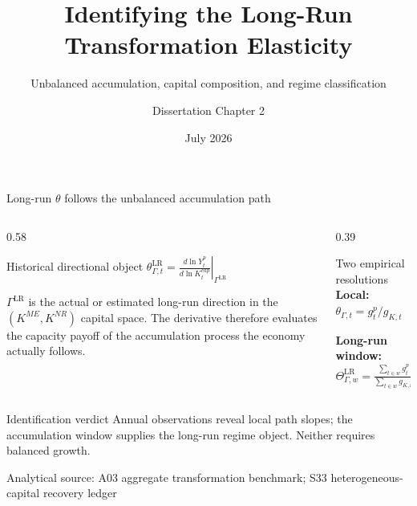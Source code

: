 \documentclass[10pt,aspectratio=169]{beamer}
\title[Directional long-run $\theta_t$]{Identifying the Long-Run Transformation Elasticity}
\subtitle{Unbalanced accumulation, capital composition, and regime classification}
\author{Dissertation Chapter 2}
\date{July 2026}
\newcommand{\LR}{\mathrm{LR}}
\newcommand{\sourcefooter}[1]{%
  \par\vfill{\tiny\color{gray!70}Analytical source: #1}\vspace{-0.35em}}
\begin{document}
\begin{frame}{Long-run $\theta$ follows the unbalanced accumulation path}
  \begin{columns}[T,onlytextwidth]
    \begin{column}{0.58\textwidth}
      \begin{block}{Historical directional object}
        \centering
        \Large
        $\displaystyle
        \theta_{\Gamma,t}^{\LR}
        =
        \left.
        \frac{d\ln Y_t^p}{d\ln K_t^{cap}}
        \right|_{\Gamma^{\LR}}$
      \end{block}
      \small
      $\Gamma^{\LR}$ is the actual or estimated long-run direction in the
      $(K^{ME},K^{NR})$ capital space. The derivative therefore evaluates the
      capacity payoff of the accumulation process the economy actually follows.
    \end{column}
    \begin{column}{0.39\textwidth}
      \begin{block}{Two empirical resolutions}
        \small
        \textbf{Local:}
        $\displaystyle \theta_{\Gamma,t}=g_t^p/g_{K,t}$

        \vspace{0.7em}
        \textbf{Long-run window:}
        $\displaystyle
        \Theta_{\Gamma,w}^{\LR}
        =\frac{\sum_{t\in w}g_t^p}{\sum_{t\in w}g_{K,t}}$
      \end{block}
    \end{column}
  \end{columns}
  \begin{alertblock}{Identification verdict}
    Annual observations reveal local path slopes; the accumulation window supplies the long-run regime object. Neither requires balanced growth.
  \end{alertblock}
  \sourcefooter{A03 aggregate transformation benchmark; S33 heterogeneous-capital recovery ledger}
\end{frame}
\end{document}
